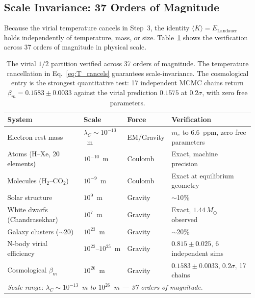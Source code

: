 \documentclass[12pt,a4paper]{article}
\begin{document}
\subsection{Scale Invariance: 37 Orders of Magnitude}

Because the virial temperature cancels in Step~3, the identity
$\langle K \rangle = E_\mathrm{Landauer}$ holds independently of
temperature, mass, or size. Table~\ref{tab:virial} shows the
verification across 37 orders of magnitude in physical scale.

\begin{table}[h]
\centering
\small
\caption{The virial $1/2$ partition verified across 37 orders of
magnitude. The temperature cancellation in Eq.~\eqref{eq:T_cancels}
guarantees scale-invariance. The cosmological entry is the strongest
quantitative test: 17 independent MCMC chains return
$\beta_m = 0.1583 \pm 0.0033$ against the virial prediction $0.1575$
at $0.2\sigma$, with zero free parameters.}
\label{tab:virial}
\begin{tabular}{p{4.0cm}p{1.6cm}p{2.0cm}p{4.2cm}}
\toprule
\textbf{System} & \textbf{Scale} & \textbf{Force} &
\textbf{Verification} \\
\midrule
Electron rest mass & $\lambda_C \sim 10^{-13}$~m & EM/Gravity &
  $m_e$ to 6.6~ppm, zero free parameters~\citep{IAM_archive} \\
Atoms (H--Xe, 20 elements) & $10^{-10}$~m & Coulomb &
  Exact, machine precision~\citep{Clementi1974} \\
Molecules (H$_2$--CO$_2$) & $10^{-9}$~m & Coulomb &
  Exact at equilibrium geometry \\
Solar structure & $10^{9}$~m & Gravity & $\sim$10\%~\citep{Christensen2002} \\
White dwarfs (Chandrasekhar) & $10^{7}$~m & Gravity &
  Exact, $1.44\,M_\odot$ observed~\citep{Chandrasekhar1931} \\
Galaxy clusters ($\sim$20) & $10^{23}$~m & Gravity &
  $\sim$20\%~\citep{Evrard1996} \\
N-body virial efficiency & $10^{22}$--$10^{25}$~m & Gravity &
  $0.815 \pm 0.025$, 6 independent sims~\citep{BryanNorman1998} \\
\rowcolor{mcmcrow}
Cosmological $\beta_m$ & $10^{26}$~m & Gravity &
  $0.1583 \pm 0.0033$, 0.2$\sigma$, 17 chains~\citep{IAM_archive} \\
\bottomrule
\multicolumn{4}{l}{\textit{Scale range: $\lambda_C \sim 10^{-13}$~m to $10^{26}$~m
--- 37 orders of magnitude.}} \\
\end{tabular}
\end{table}
\end{document}

